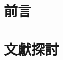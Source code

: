 \documentclass[12pt, a4paper]{ntust_report}
\begin{document}

\makeatother
\setlength{\parindent}{2em} %






% 

% 

%

%
\chapter{前言}
\label{Sec:Introduction}


\chapter{文獻探討}
\label{Sec:RelatedWork}

\end{document}
